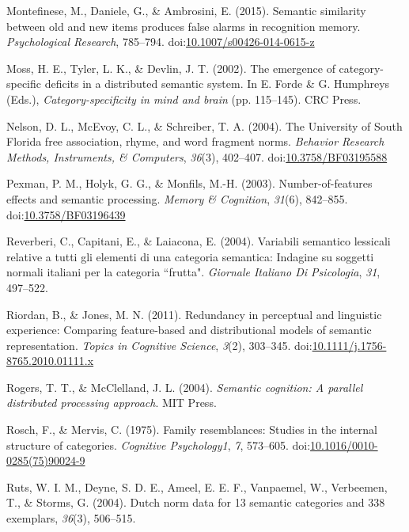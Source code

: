 \documentclass[english,man]{apa6}
\theoremstyle{definition}
\theoremstyle{definition}
\theoremstyle{definition}
\theoremstyle{remark}
\begin{document}
\hypertarget{ref-Montefinese2015}{}
Montefinese, M., Daniele, G., \& Ambrosini, E. (2015). Semantic
similarity between old and new items produces false alarms in
recognition memory. \emph{Psychological Research}, 785--794.
doi:\href{https://doi.org/10.1007/s00426-014-0615-z}{10.1007/s00426-014-0615-z}

\hypertarget{ref-Moss2002}{}
Moss, H. E., Tyler, L. K., \& Devlin, J. T. (2002). The emergence of
category-specific deficits in a distributed semantic system. In E. Forde
\& G. Humphreys (Eds.), \emph{Category-specificity in mind and brain}
(pp. 115--145). CRC Press.

\hypertarget{ref-Nelson2004}{}
Nelson, D. L., McEvoy, C. L., \& Schreiber, T. A. (2004). The University
of South Florida free association, rhyme, and word fragment norms.
\emph{Behavior Research Methods, Instruments, \& Computers},
\emph{36}(3), 402--407.
doi:\href{https://doi.org/10.3758/BF03195588}{10.3758/BF03195588}

\hypertarget{ref-Pexman2003}{}
Pexman, P. M., Holyk, G. G., \& Monfils, M.-H. (2003).
Number-of-features effects and semantic processing. \emph{Memory \&
Cognition}, \emph{31}(6), 842--855.
doi:\href{https://doi.org/10.3758/BF03196439}{10.3758/BF03196439}

\hypertarget{ref-Reverberi2004}{}
Reverberi, C., Capitani, E., \& Laiacona, E. (2004). Variabili semantico
lessicali relative a tutti gli elementi di una categoria semantica:
Indagine su soggetti normali italiani per la categoria ``frutta".
\emph{Giornale Italiano Di Psicologia}, \emph{31}, 497--522.

\hypertarget{ref-Riordan2011}{}
Riordan, B., \& Jones, M. N. (2011). Redundancy in perceptual and
linguistic experience: Comparing feature-based and distributional models
of semantic representation. \emph{Topics in Cognitive Science},
\emph{3}(2), 303--345.
doi:\href{https://doi.org/10.1111/j.1756-8765.2010.01111.x}{10.1111/j.1756-8765.2010.01111.x}

\hypertarget{ref-Rogers2004}{}
Rogers, T. T., \& McClelland, J. L. (2004). \emph{Semantic cognition: A
parallel distributed processing approach}. MIT Press.

\hypertarget{ref-Rosch1975}{}
Rosch, F., \& Mervis, C. (1975). Family resemblances: Studies in the
internal structure of categories. \emph{Cognitive Psychology1},
\emph{7}, 573--605.
doi:\href{https://doi.org/10.1016/0010-0285(75)90024-9}{10.1016/0010-0285(75)90024-9}

\hypertarget{ref-Ruts2004}{}
Ruts, W. I. M., Deyne, S. D. E., Ameel, E. E. F., Vanpaemel, W.,
Verbeemen, T., \& Storms, G. (2004). Dutch norm data for 13 semantic
categories and 338 exemplars, \emph{36}(3), 506--515.
\end{document}
